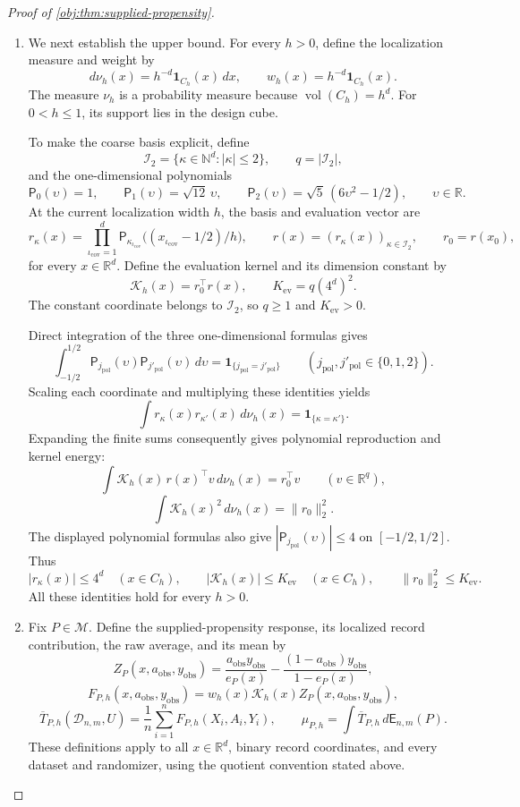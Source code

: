 \begin{proof}[Proof of \cref{obj:thm:supplied-propensity}]
\begin{enumerate}
\item We next establish the upper bound. For every \(h>0\), define the localization measure and weight by
\[
d\nu_h(x)=h^{-d}\mathbf1_{C_h}(x)\,dx,
\qquad
w_h(x)=h^{-d}\mathbf1_{C_h}(x).
\]
The measure \(\nu_h\) is a probability measure because
\(\operatorname{vol}(C_h)=h^d\). For \(0<h\le1\), its support lies in the design cube.

To make the coarse basis explicit, define
\[
\mathcal I_2=
\{\kappa\in\mathbb N^d:|\kappa|\le2\},
\qquad
q=|\mathcal I_2|,
\]
and the one-dimensional polynomials
\[
\mathsf P_0(\upsilon)=1,\qquad
\mathsf P_1(\upsilon)=\sqrt{12}\,\upsilon,\qquad
\mathsf P_2(\upsilon)=\sqrt5\,(6\upsilon^2-1/2),
\qquad \upsilon\in\mathbb R.
\]
At the current localization width \(h\), the basis and evaluation vector are
\[
r_\kappa(x)=
\prod_{\iota_{\mathrm{cov}}=1}^d
\mathsf P_{\kappa_{\iota_{\mathrm{cov}}}}\bigl((x_{\iota_{\mathrm{cov}}}-1/2)/h\bigr),
\qquad
r(x)=(r_\kappa(x))_{\kappa\in\mathcal I_2},
\qquad
r_0=r(x_0),
\]
for every \(x\in\mathbb R^d\). Define the evaluation kernel and its dimension constant by
\[
\mathcal K_h(x)=r_0^\top r(x),
\qquad
K_{\mathrm{ev}}=q(4^d)^2.
\]
The constant coordinate belongs to \(\mathcal I_2\), so \(q\ge1\) and \(K_{\mathrm{ev}}>0\).

Direct integration of the three one-dimensional formulas gives
\[
\int_{-1/2}^{1/2}
\mathsf P_{j_{\mathrm{pol}}}(\upsilon)
\mathsf P_{j'_{\mathrm{pol}}}(\upsilon)\,d\upsilon
=
\mathbf1_{\{j_{\mathrm{pol}}=j'_{\mathrm{pol}}\}}
\qquad
(j_{\mathrm{pol}},j'_{\mathrm{pol}}\in\{0,1,2\}).
\]
Scaling each coordinate and multiplying these identities yields
\[
\int r_\kappa(x)r_{\kappa'}(x)\,d\nu_h(x)
=
\mathbf1_{\{\kappa=\kappa'\}}.
\]
Expanding the finite sums consequently gives polynomial reproduction and kernel energy:
\[
\int\mathcal K_h(x)\,r(x)^\top v\,d\nu_h(x)
=r_0^\top v
\qquad(v\in\mathbb R^q),
\]
\[
\int\mathcal K_h(x)^2\,d\nu_h(x)=\|r_0\|_2^2.
\]
The displayed polynomial formulas also give
\(|\mathsf P_{j_{\mathrm{pol}}}(\upsilon)|\le4\) on \([-1/2,1/2]\). Thus
\[
|r_\kappa(x)|\le4^d\quad(x\in C_h),
\qquad
|\mathcal K_h(x)|\le K_{\mathrm{ev}}\quad(x\in C_h),
\qquad
\|r_0\|_2^2\le K_{\mathrm{ev}}.
\]
All these identities hold for every \(h>0\).

\item Fix \(P\in\mathcal M\). Define the supplied-propensity response, its localized record contribution, the raw average, and its mean by
\[
Z_P(x,a_{\mathrm{obs}},y_{\mathrm{obs}})
=
\frac{a_{\mathrm{obs}}y_{\mathrm{obs}}}{e_P(x)}
-
\frac{(1-a_{\mathrm{obs}})y_{\mathrm{obs}}}{1-e_P(x)},
\]
\[
F_{P,h}(x,a_{\mathrm{obs}},y_{\mathrm{obs}})
=
w_h(x)\mathcal K_h(x)
Z_P(x,a_{\mathrm{obs}},y_{\mathrm{obs}}),
\]
\[
\overline T_{P,h}(\mathcal D_{n,m},U)
=
\frac1n\sum_{i=1}^nF_{P,h}(X_i,A_i,Y_i),
\qquad
\mu_{P,h}
=
\int\overline T_{P,h}\,d\mathsf E_{n,m}(P).
\]
These definitions apply to all \(x\in\mathbb R^d\), binary record coordinates, and every dataset and randomizer, using the quotient convention stated above.


\end{enumerate}
\end{proof}
